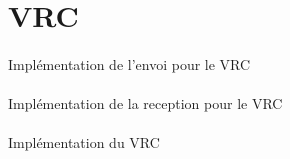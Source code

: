 


    \section{VRC}

        \paragraph{}
Implémentation de l'envoi pour le VRC


        \paragraph{}
Implémentation de la reception pour le VRC


        \paragraph{}
Implémentation du VRC

